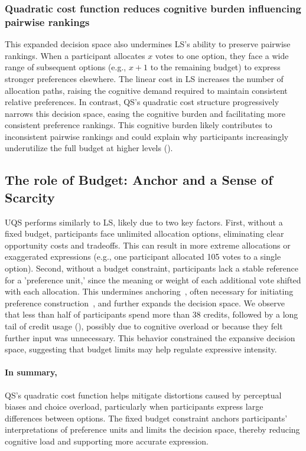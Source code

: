 \subsubsection{Quadratic cost function reduces cognitive burden influencing pairwise rankings}
This expanded decision space also undermines LS's ability to preserve pairwise rankings. When a participant allocates $x$ votes to one option, they face a wide range of subsequent options (e.g., $x+1$ to the remaining budget) to express stronger preferences elsewhere. The linear cost in LS increases the number of allocation paths, raising the cognitive demand required to maintain consistent relative preferences. In contrast, QS's quadratic cost structure progressively narrows this decision space, easing the cognitive burden and facilitating more consistent preference rankings. This cognitive burden likely contributes to inconsistent pairwise rankings and could explain why participants increasingly underutilize the full budget at higher levels (). %

\subsection{The role of Budget: Anchor and a Sense of Scarcity}
UQS performs similarly to LS, likely due to two key factors. First, without a fixed budget, participants face unlimited allocation options, eliminating clear opportunity costs and tradeoffs. This can result in more extreme allocations or exaggerated expressions (e.g., one participant allocated 105 votes to a single option). Second, without a budget constraint, participants lack a stable reference for a 'preference unit,' since the meaning or weight of each additional vote shifted with each allocation. This undermines anchoring~\cite{daniel2017thinking, tverskyJudgmentUncertaintyHeuristics1974}, often necessary for initiating preference construction~\cite{lichtensteinConstructionPreference2006}, and further expands the decision space. We observe that less than half of participants spend more than 38 credits, followed by a long tail of credit usage (), possibly due to cognitive overload or because they felt further input was unnecessary. This behavior constrained the expansive decision space, suggesting that budget limits may help regulate expressive intensity.

\paragraph{In summary,} QS's quadratic cost function helps mitigate distortions caused by perceptual biases and choice overload, particularly when participants express large differences between options. The fixed budget constraint anchors participants' interpretations of preference units and limits the decision space, thereby reducing cognitive load and supporting more accurate expression.

